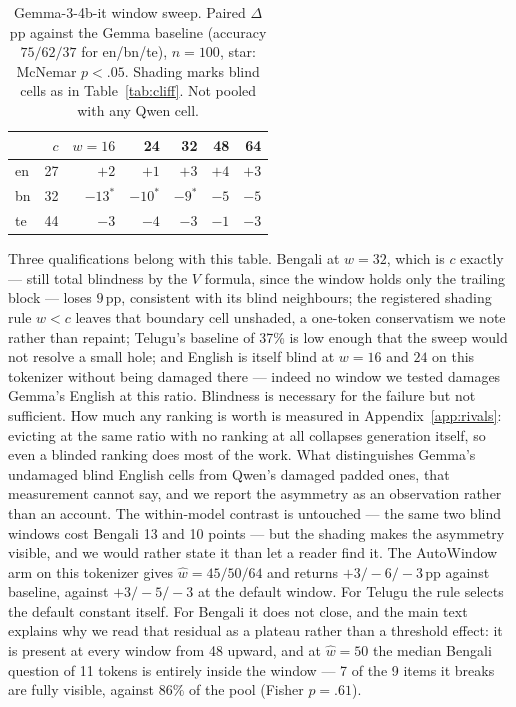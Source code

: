 \documentclass{article}
\newcommand{\blind}[1]{\cellcolor{blindcell}#1}
\begin{document}
\begin{table}[h]
\caption{Gemma-3-4b-it window sweep. Paired $\Delta$pp against the
Gemma baseline (accuracy $75/62/37$ for en/bn/te), $n{=}100$, star:
McNemar $p<.05$. Shading marks blind cells as in Table~\ref{tab:cliff}.
Not pooled with any Qwen cell.}
\label{tab:gemmasweep}
\centering
\small
\begin{tabular}{lrrrrrr}
\toprule
 & $c$ & $w{=}16$ & 24 & 32 & 48 & 64 \\
\midrule
en & 27 & \blind{${+}2$} & \blind{${+}1$} & ${+}3$ & ${+}4$ & ${+}3$ \\
bn & 32 & \blind{${-}13^{*}$} & \blind{${-}10^{*}$} & ${-}9^{*}$ & ${-}5$ & ${-}5$ \\
te & 44 & \blind{${-}3$} & \blind{${-}4$} & \blind{${-}3$} & ${-}1$ & ${-}3$ \\
\bottomrule
\end{tabular}
\end{table}

Three qualifications belong with this table. Bengali at $w{=}32$, which
is $c$ exactly --- still total blindness by the $V$ formula, since the
window holds only the trailing block --- loses $9$\,pp, consistent with
its blind neighbours; the registered shading rule $w<c$ leaves that
boundary cell unshaded, a one-token conservatism we note rather than
repaint; Telugu's baseline of 37\% is low enough
that the sweep would not resolve a small hole; and English is itself
blind at $w{=}16$ and $24$ on this tokenizer without being damaged
there --- indeed no window we tested damages Gemma's English at this
ratio. Blindness is necessary for the failure but not sufficient. How much any
ranking is worth is measured in Appendix~\ref{app:rivals}: evicting at
the same ratio with no ranking at all collapses generation itself, so
even a blinded ranking does most of the work. What distinguishes Gemma's
undamaged blind English cells from Qwen's damaged padded ones, that
measurement cannot say, and we report the asymmetry as an observation
rather than an account.
The within-model contrast is untouched --- the same two blind windows
cost Bengali 13 and 10 points --- but the shading makes the asymmetry
visible, and we would rather state it than let a reader find it. The AutoWindow arm on this
tokenizer gives $\hat w = 45/50/64$ and returns $+3/{-}6/{-}3$\,pp
against baseline, against $+3/{-}5/{-}3$ at the default window. For
Telugu the rule selects the default constant itself. For Bengali it does
not close, and the main text explains why we read that residual as a
plateau rather than a threshold effect: it is present at every window
from 48 upward, and at $\hat w{=}50$ the median Bengali question of 11
tokens is entirely inside the window --- 7 of the 9 items it breaks are
fully visible, against $86\%$ of the pool (Fisher $p{=}.61$).
\end{document}

